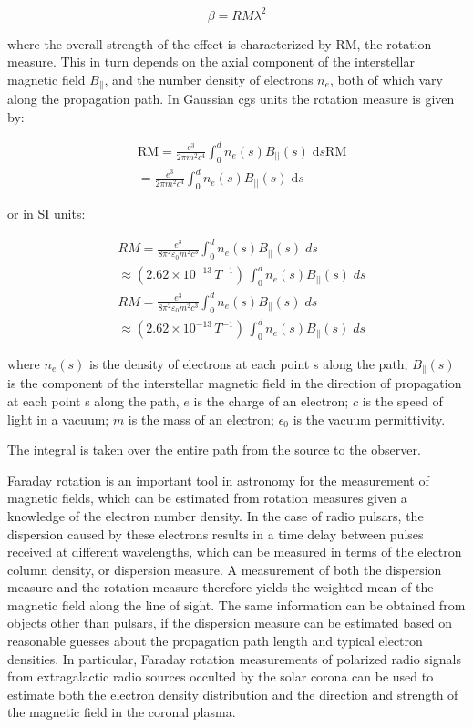 \begin{equation*}
\beta= RM \lambda^2
\end{equation*}

where the overall strength of the effect is characterized by RM, the rotation measure. This in turn depends on the axial component of the interstellar magnetic field $B_{\parallel}$, and the number density of electrons $n_e$, both of which vary along the propagation path. In Gaussian cgs units the rotation measure is given by:

 \begin{align*}
&{\displaystyle \mathrm {RM} ={\frac {e^{3}}{2\pi m^{2}c^{4}}}\int _{0}^{d}n_{e}(s)B_{||}(s)\;\mathrm {d} s} {\mathrm {RM}}\\
&={\frac {e^{3}}{2\pi m^{2}c^{4}}}\int _{0}^{d}n_{e}(s)B_{{||}}(s)\;{\mathrm {d}}s
 \end{align*}

or in SI units:

\begin{align*}
 &RM =\frac{e^{3}}{8\pi^{2}\varepsilon_{0}m^2c^3}\int_0^dn_{e}(s)B_{||}(s)\;ds\\
 &\approx (2.62\times 10^{-13}\,T^{-1})\,\int_0^dn_{e}(s)B_{||}(s)\;ds\\
 &RM=\frac{e^{3}}{8\pi^2\varepsilon_{0}m^2c^3}\int_0^dn_{e}(s)B_{\parallel}(s)\;ds\\
 &\approx (2.62\times 10^{-13}\,T^{-1})\,\int_0^dn_{e}(s)B_{\parallel}(s)\;ds
\end{align*}

where $n_e(s)$ is the density of electrons at each point s along the path, $B_{\parallel}(s)$ is the component of the interstellar magnetic field in the direction of propagation at each point s along the path, $e$ is the charge of an electron; $c$ is the speed of light in a vacuum; $m$ is the mass of an electron; $\epsilon_{0}$ is the vacuum permittivity.

The integral is taken over the entire path from the source to the observer.

Faraday rotation is an important tool in astronomy for the measurement of magnetic fields, which can be estimated from rotation measures given a knowledge of the electron number density. In the case of radio pulsars, the dispersion caused by these electrons results in a time delay between pulses received at different wavelengths, which can be measured in terms of the electron column density, or dispersion measure. A measurement of both the dispersion measure and the rotation measure therefore yields the weighted mean of the magnetic field along the line of sight. The same information can be obtained from objects other than pulsars, if the dispersion measure can be estimated based on reasonable guesses about the propagation path length and typical electron densities. In particular, Faraday rotation measurements of polarized radio signals from extragalactic radio sources occulted by the solar corona can be used to estimate both the electron density distribution and the direction and strength of the magnetic field in the coronal plasma.

